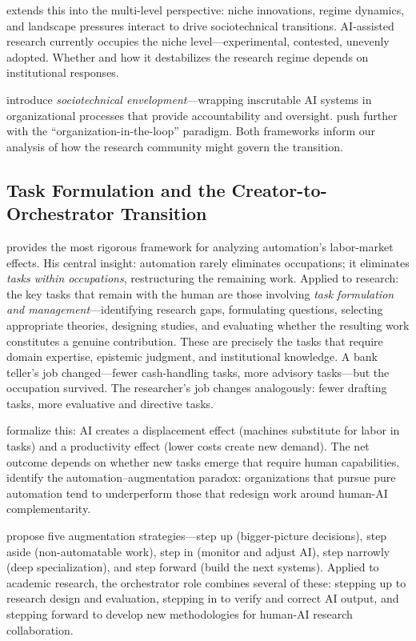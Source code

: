 \documentclass{article}
\begin{document}
\citet{geels2010transitions} extends this into the multi-level perspective: niche innovations, regime dynamics, and landscape pressures interact to drive sociotechnical transitions. AI-assisted research currently occupies the niche level---experimental, contested, unevenly adopted. Whether and how it destabilizes the research regime depends on institutional responses.

\citet{asatiani2021envelopment} introduce \textit{sociotechnical envelopment}---wrapping inscrutable AI systems in organizational processes that provide accountability and oversight. \citet{herrmann2022keeping} push further with the ``organization-in-the-loop'' paradigm. Both frameworks inform our analysis of how the research community might govern the transition.

\subsection{Task Formulation and the Creator-to-Orchestrator Transition}

\citet{autor2015why} provides the most rigorous framework for analyzing automation's labor-market effects. His central insight: automation rarely eliminates occupations; it eliminates \textit{tasks within occupations}, restructuring the remaining work. Applied to research: the key tasks that remain with the human are those involving \textit{task formulation and management}---identifying research gaps, formulating questions, selecting appropriate theories, designing studies, and evaluating whether the resulting work constitutes a genuine contribution. These are precisely the tasks that require domain expertise, epistemic judgment, and institutional knowledge. A bank teller's job changed---fewer cash-handling tasks, more advisory tasks---but the occupation survived. The researcher's job changes analogously: fewer drafting tasks, more evaluative and directive tasks.

\citet{acemoglu2018automation} formalize this: AI creates a displacement effect (machines substitute for labor in tasks) and a productivity effect (lower costs create new demand). The net outcome depends on whether new tasks emerge that require human capabilities. \citet{raisch2021ai} identify the automation--augmentation paradox: organizations that pursue pure automation tend to underperform those that redesign work around human-AI complementarity.

\citet{davenport2016just} propose five augmentation strategies---step up (bigger-picture decisions), step aside (non-automatable work), step in (monitor and adjust AI), step narrowly (deep specialization), and step forward (build the next systems). Applied to academic research, the orchestrator role combines several of these: stepping up to research design and evaluation, stepping in to verify and correct AI output, and stepping forward to develop new methodologies for human-AI research collaboration.
\end{document}
